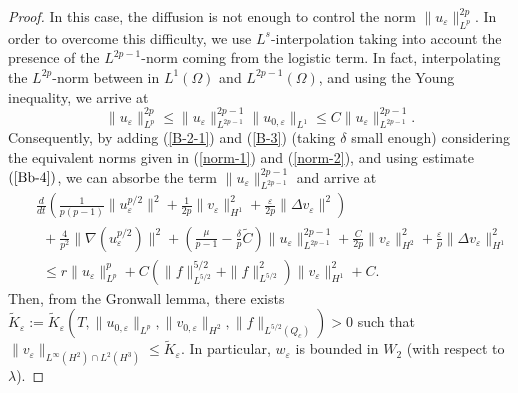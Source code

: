 \documentclass[11pt,reqno]{amsart}%
\numberwithin{equation}{section}
\begin{document}
{\begin{proof}
 In this case, 
the diffusion is not enough to control the norm $\|u_\varepsilon\|_{L^p}^{2p}$. In order to overcome this difficulty, we use $L^s$-interpolation taking into account the presence of the $L^{2p-1}$-norm coming from the logistic term. In fact, interpolating the $L^{2p}$-norm between in $L^1(\Omega)$ and $L^{2p-1}(\Omega)$, and using the Young inequality, we arrive at
\begin{equation}
 \|u_\varepsilon\|_{L^p}^{2p}
\le \|u_\varepsilon\|_{L^{2p-1}}^{2p-1}\|u_{0, \varepsilon}\|_{L^{1}}
\le C\|u_\varepsilon\|_{L^{2p-1}}^{2p-1}.\label{Bb-4}
\end{equation}
Consequently, by adding  (\ref{B-2-1}) and (\ref{B-3})  (taking $\delta$ small enough) 
considering the equivalent norms given in (\ref{norm-1}) and (\ref{norm-2}), 
and using estimate $(\ref{Bb-4})$, 
we can absorbe the term $\|u_\varepsilon\|_{L^{2p-1}}^{2p-1}$ and arrive at
\begin{eqnarray}
&&\frac{d}{dt}\left(\frac{1}{p(p-1)}\|u_\varepsilon^{p/2}\|^2
+\frac{1}{2p} %
\| v_\varepsilon\|_{H^1}^2
+\frac{\varepsilon}{2p}\|\Delta v_\varepsilon\|^2\right)\nonumber\\
&&\ \ +\frac{4}{p^2}\|\nabla(u_\varepsilon^{p/2})\|^2
+ \left( \frac\mu{p-1}-\frac\delta p \widetilde C \right)\|u_\varepsilon\|_{L^{2p-1}}^{2p-1}
+{\frac{C}{2p}\|v_\varepsilon\|^2_{H^2}}
+\frac{\varepsilon}{p}\|\Delta v_\varepsilon\|_{H^1}^2\nonumber\\
&&\ \ \le r\|u_\varepsilon\|^p_{L^p}
+{C\left(\|f\|^{5/2}_{L^{5/2}}+\|f\|^2_{L^{5/2}}\right)\|v_\varepsilon\|^2_{H^1}}+C.
\label{Bb-5} 
\end{eqnarray}
%
Then, 
from the Gronwall lemma,  there exists %
$\widetilde{K}_\varepsilon:=\widetilde{K}_\varepsilon\left(T,\|u_{0,\varepsilon}\|_{L^p},\|v_{0,\varepsilon}\|_{H^2},\|f\|_{L^{5/2}(Q_c)}\right)>0$ such that
$
\|v_\varepsilon\|_{L^\infty(H^2)\cap L^2(H^3)}\le \widetilde{K}_\varepsilon.
$
In particular, $w_\varepsilon$ is bounded in $W_2$ (with respect to $\lambda$).


\end{proof}}
\end{document}
